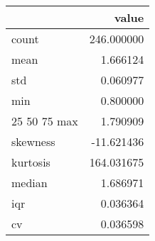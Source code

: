 \begin{tabular}{lr}
\toprule
 & value \\
\midrule
count & 246.000000 \\
mean & 1.666124 \\
std & 0.060977 \\
min & 0.800000 \\
25%
50%
75%
max & 1.790909 \\
skewness & -11.621436 \\
kurtosis & 164.031675 \\
median & 1.686971 \\
iqr & 0.036364 \\
cv & 0.036598 \\
\bottomrule
\end{tabular}
